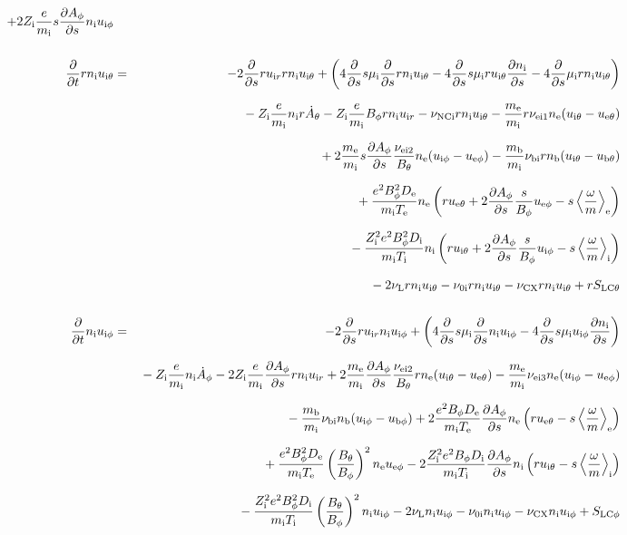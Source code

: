 \documentclass[11pt]{article}
\def\r#1{{\rm#1}}
\def\ddt{\frac{\partial}{\partial t}}
\def\dds{\frac{\partial}{\partial s}}
\def\dd#1{\frac{\partial #1}{\partial s}}
\def\ave#1{\left\langle#1\right\rangle}
\def\me{m_\r{e}}
\def\mi{m_\r{i}}
\def\mb{m_\r{b}}
\def\mui{\mu_\r{i}}
\def\De{D_\r{e}}
\def\Di{D_\r{i}}
\def\ne{n_\r{e}}
\def\ni{n_\r{i}}
\def\nb{n_\r{b}}
\def\uir{u_{\r{i}r}}
\def\ueth{u_{\r{e}\theta}}
\def\uith{u_{\r{i}\theta}}
\def\ubth{u_{\r{b}\theta}}
\def\ueph{u_{\r{e}\phi}}
\def\uiph{u_{\r{i}\phi}}
\def\ubph{u_{\r{b}\phi}}
\def\Bth{B_\theta}
\def\Bph{B_\phi}
\def\Athd{\dot{A}_\theta}
\def\Aphd{\dot{A}_\phi}
\def\Aph{A_\phi}
\def\Te{T_\r{e}}
\def\Ti{T_\r{i}}
\def\Zi{Z_\r{i}}
\def\nuNCi{\nu_\r{NCi}}
\def\nubi{\nu_\r{bi}}
\def\nuni{\nu_\r{0i}}
\def\nuL{\nu_\r{L}}
\def\nuCX{\nu_\r{CX}}
\begin{document}
\begin{eqnarray}
%
  + 2 \Zi \frac{e}{\mi} s \dd{\Aph} \ni \uiph
\\[5mm]
%
%
  \ddt r \ni \uith &=&
%
  - 2 \dds r \uir r \ni \uith
%
  + \left(   4 \dds s \mui \dds r \ni \uith
%
           - 4 \dds s \mui r \uith \dd{\ni}
%
	   - 4 \dds \mui r \ni \uith \right)
\nonumber\\[2.5mm]&&{}
%
  - \Zi \frac{e}{\mi} \ni r \Athd
%
  - \Zi \frac{e}{\mi} \Bph r \ni \uir
%
  - \nuNCi r \ni \uith
%
  - \frac{\me}{\mi} r \nu_\r{ei1} \ne (\uith - \ueth)
\nonumber\\[2.5mm]&&{}
%
  + 2 \frac{\me}{\mi} s \dd{\Aph} \frac{\nu_\r{ei2}}{\Bth} \ne (\uiph - \ueph)
%
  - \frac{\mb}{\mi} \nu_\r{bi} r \nb (\uith - \ubth)
\nonumber\\[2.5mm]&&{}
%
  + \frac{e^2 \Bph^2 \De}{\mi\Te}\ne
    \left(r \ueth + 2\dd{\Aph}\frac{s}{\Bph}\ueph - s
     \ave{\frac{\omega}{m}}_\r{e} \right)
\nonumber\\[2.5mm]&&{}
%
  - \frac{\Zi^2 e^2 \Bph^2 \Di}{\mi\Ti}\ni
    \left(r \uith + 2\dd{\Aph}\frac{s}{\Bph}\uiph - s
     \ave{\frac{\omega}{m}}_\r{i} \right)
\nonumber\\[2.5mm]&&{}
%
  - 2 \nuL r \ni \uith
%
  - \nuni r \ni \uith
%
  - \nuCX r \ni \uith
%
  + r S_\r{LC\theta}
%
%
\\[5mm]
%
%
  \ddt \ni \uiph &=&
%
  - 2 \dds r \uir \ni \uiph
%
  + \left(   4 \dds s \mui \dds \ni \uiph
%
           - 4 \dds s \mui \uiph \dd{\ni} \right)
\nonumber\\[2.5mm]&&{}
%
  - \Zi \frac{e}{\mi} \ni \Aphd
%
  - 2 \Zi \frac{e}{\mi} \dd{\Aph} r \ni \uir 
%
  + 2 \frac{\me}{\mi} \dd{\Aph} \frac{\nu_\r{ei2}}{\Bth} r \ne (\uith - \ueth)
%
  - \frac{\me}{\mi} \nu_\r{ei3} \ne (\uiph - \ueph)
\nonumber\\[2.5mm]&&{}
%
  - \frac{\mb}{\mi} \nubi \nb (\uiph - \ubph)
%
  + 2\frac{e^2 \Bph \De}{\mi\Te}\dd{\Aph}\ne
    \left(r \ueth - s \ave{\frac{\omega}{m}}_\r{e} \right)
\nonumber\\[2.5mm]&&{}
%
  + \frac{e^2 \Bph^2 \De}{\mi\Te}\left(\frac{\Bth}{\Bph}\right)^2\ne\ueph
%
  - 2\frac{\Zi^2 e^2 \Bph \Di}{\mi\Ti}\dd{\Aph}\ni
    \left(r \uith - s \ave{\frac{\omega}{m}}_\r{i} \right)
\nonumber\\[2.5mm]&&{}
%
  - \frac{\Zi^2 e^2 \Bph^2 \Di}{\mi\Ti}\left(\frac{\Bth}{\Bph}\right)^2\ni\uiph
%
  - 2 \nuL \ni \uiph
%
  - \nuni \ni \uiph
%
  - \nuCX \ni \uiph
%
  + S_\r{LC\phi}

\end{eqnarray}
\end{document}

